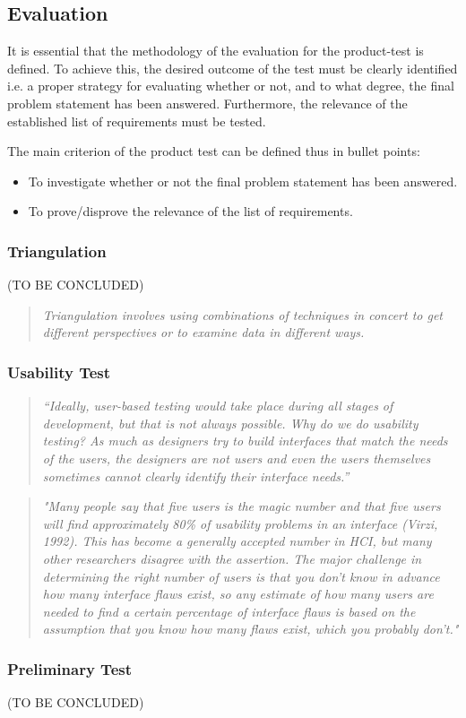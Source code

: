 \subsection{Evaluation}
It is essential that the methodology of the evaluation for the product-test is defined. To achieve this, the desired outcome of the test must be clearly identified i.e. a proper strategy for evaluating whether or not, and to what degree, the final problem statement has been answered. Furthermore, the relevance of the established list of requirements must be tested.

The main criterion of the product test can be defined thus in bullet points:
\begin{itemize}
\item To investigate whether or not the final problem statement has been answered.
\item To prove/disprove the relevance of the list of requirements.
\end{itemize}

\subsubsection{Triangulation}
(TO BE CONCLUDED)
\begin{quote}
\textit{Triangulation involves using combinations of techniques in concert to get different perspectives or to examine data in different ways.} \parencite{Rogers2002}
\end{quote}

\subsubsection{Usability Test}
\begin{quote}
\textit{“Ideally, user-based testing would take place during all stages of development, but that is not always possible. Why do we do usability testing? As much as designers try to build interfaces that match the needs of the users, the designers are not users and even the users themselves sometimes cannot clearly identify their interface needs.”}
\parencite{Lazar2010}
\end{quote}
\begin{quote}
\textit{"Many people say that five users is the magic number and that five users will find approximately 80\% of usability problems in an interface (Virzi, 1992). This has become a generally accepted number in HCI, but many other researchers disagree with the assertion. The major challenge in determining the right number of users is that you don’t know in advance how many interface flaws exist, so any estimate of how many users are needed to find a certain percentage of interface flaws is based on the assumption that you know how many flaws exist, which you probably don’t."}
\parencite{Lazar2010}
\end{quote}

\subsubsection{Preliminary Test}
(TO BE CONCLUDED)

